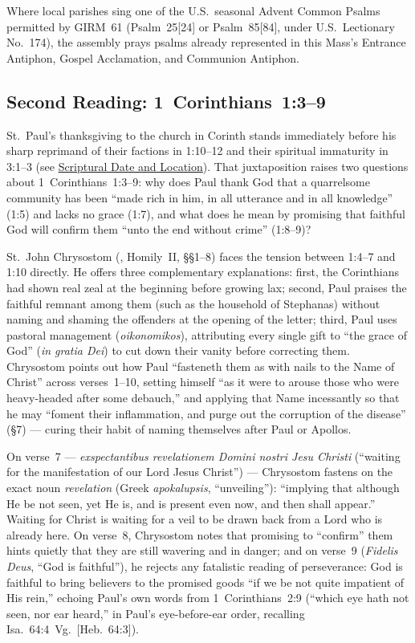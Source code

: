 Where local parishes sing one of the U.S.\ seasonal Advent Common Psalms permitted by GIRM~61 (Psalm~25[24] or Psalm~85[84], under U.S.\ Lectionary No.~174), the assembly prays psalms already represented in this Mass's Entrance Antiphon, Gospel Acclamation, and Communion Antiphon.

\subsection{Second Reading: 1~Corinthians~1:3--9}

St.~Paul's thanksgiving to the church in Corinth stands immediately before his sharp reprimand of their factions in 1:10--12 and their spiritual immaturity in 3:1--3 (see \hyperref[sec:date-location]{Scriptural Date and Location}). That juxtaposition raises two questions about 1~Corinthians~1:3--9: why does Paul thank God that a quarrelsome community has been ``made rich in him, in all utterance and in all knowledge'' (1:5) and lacks no grace (1:7), and what does he mean by promising that faithful God will confirm them ``unto the end without crime'' (1:8--9)?

St.~John Chrysostom (, Homily~II, §§1--8) faces the tension between 1:4--7 and 1:10 directly. He offers three complementary explanations: first, the Corinthians had shown real zeal at the beginning before growing lax; second, Paul praises the faithful remnant among them (such as the household of Stephanas) without naming and shaming the offenders at the opening of the letter; third, Paul uses pastoral management (\emph{oikonomikos}), attributing every single gift to ``the grace of God'' (\emph{in gratia Dei}) to cut down their vanity before correcting them. Chrysostom points out how Paul ``fasteneth them as with nails to the Name of Christ'' across verses~1--10, setting himself ``as it were to arouse those who were heavy-headed after some debauch,'' and applying that Name incessantly so that he may ``foment their inflammation, and purge out the corruption of the disease'' (§7) --- curing their habit of naming themselves after Paul or Apollos.

On verse~7 --- \emph{exspectantibus revelationem Domini nostri Jesu Christi} (``waiting for the manifestation of our Lord Jesus Christ'') --- Chrysostom fastens on the exact noun \emph{revelation} (Greek \emph{apokalupsis}, ``unveiling''): ``implying that although He be not seen, yet He is, and is present even now, and then shall appear.'' Waiting for Christ is waiting for a veil to be drawn back from a Lord who is already here. On verse~8, Chrysostom notes that promising to ``confirm'' them hints quietly that they are still wavering and in danger; and on verse~9 (\emph{Fidelis Deus}, ``God is faithful''), he rejects any fatalistic reading of perseverance: God is faithful to bring believers to the promised goods ``if we be not quite impatient of His rein,'' echoing Paul's own words from 1~Corinthians~2:9 (``which eye hath not seen, nor ear heard,'' in Paul's eye-before-ear order, recalling Isa.~64:4~Vg.\ [Heb.~64:3]).

